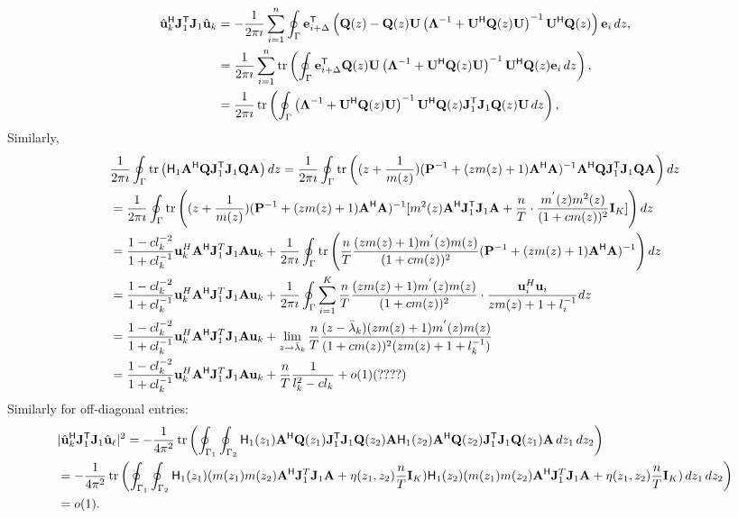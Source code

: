 \documentclass[11pt,a4paper]{article}
\begin{document}
\begin{align*}
		\hat \uu_k^\H \J_1^\T \J_1 \hat \uu_k &= -\frac1{2 \pi \imath} \sum_{i=1}^n \oint_{\Gamma} \ee_{i + \Delta}^\T \left(  \Q(z) - \Q(z) \U \left( \bLambda^{-1} + \U^\H \Q(z) \U \right)^{-1} \U^\H \Q(z) \right) \ee_{i}\,dz, \\ 
		&=\frac1{2 \pi \imath} \sum_{i=1}^n \tr \left(  \oint_{\Gamma} \ee_{i + \Delta}^\T \Q(z) \U \left( \bLambda^{-1} + \U^\H \Q(z) \U \right)^{-1} \U^\H \Q(z) \ee_{i}\,dz \right), \\ 
		&=\frac1{2 \pi \imath} \tr \left( \oint_{\Gamma} \left( \bLambda^{-1} + \U^\H \Q(z) \U \right)^{-1} \U^\H \Q(z) \J_1^\T \J_1 \Q(z) \U\,dz \right),
\end{align*}
Similarly,
\begin{align*}
    &\frac1{2 \pi \imath}  \oint_{\Gamma} \tr \left( \H_1 \A^\H \Q\J_1^\T \J_1 \Q \A \right) dz = \frac1{2 \pi \imath}  \oint_{\Gamma} \tr \left( (z+\frac{1}{m(z)})(\P^{-1} + (zm(z)+1)\A^ \H \A)^{-1} \A^\H \Q\J_1^\T \J_1 \Q \A \right) dz \\
    &= \frac1{2 \pi \imath}  \oint_{\Gamma} \tr \left( (z+\frac{1}{m(z)})(\P^{-1} + (zm(z)+1)\A^ \H \A)^{-1} [m^2(z)\A^\H \J_1^\T \J_1 \A + \frac{n}{T}\cdot\frac{m^{'}(z)m^2(z)}{(1+cm(z))^2}\I_K ]\right) dz \\
    &= \frac{1-c l_k^{-2}}{1+c l_k^{-1}} \uu_k^H \A^\H \J_1^T \J_1 \A \uu_k + \frac1{2 \pi \imath}  \oint_{\Gamma} \tr \left( \frac{n}{T} \frac{(zm(z)+1)m^{'}(z)m(z)}{(1+cm(z))^2} (\P^{-1} + (zm(z)+1)\A^ \H \A)^{-1} \right) dz \\
    &= \frac{1-c l_k^{-2}}{1+c l_k^{-1}} \uu_k^H \A^\H \J_1^T \J_1 \A \uu_k + \frac1{2 \pi \imath}  \oint_{\Gamma} \sum_{i=1}^K  \frac{n}{T} \frac{(zm(z)+1)m^{'}(z)m(z)}{(1+cm(z))^2}\cdot \frac{\uu_i^H \uu_i}{zm(z)+1+l_i^{-1}} dz \\
    &= \frac{1-c l_k^{-2}}{1+c l_k^{-1}} \uu_k^H \A^\H \J_1^T \J_1 \A \uu_k + \lim_{z \to \bar\lambda_k} \frac{n}{T}
     \frac{(z-\bar\lambda_k)(zm(z)+1)m^{'}(z)m(z)}{(1+cm(z))^2(zm(z)+1+l_k^{-1})} \\
     &= \frac{1-c l_k^{-2}}{1+c l_k^{-1}} \uu_k^H \A^\H \J_1^T \J_1 \A \uu_k + \frac{n}{T} \frac{1}{l_k^2-cl_k} +o(1)  (????)
\end{align*}
Similarly for off-diagonal entries:
\begin{align*}
    &|\hat \uu_k^\H \J_1^\T \J_1 \hat \uu_\ell|^2 = - \frac1{4 \pi^2} \tr \left( \oint_{\Gamma_1} \oint_{\Gamma_2} \H_1(z_1)  \A^\H \Q(z_1) \J_1^\T \J_1 \Q(z_2) \A \H_1(z_2)  \A^\H \Q(z_2) \J_1^\T \J_1 \Q(z_1) \A \,dz_1\,dz_2 \right) \\
    &= - \frac1{4 \pi^2} \tr \left( \oint_{\Gamma_1} \oint_{\Gamma_2} \H_1(z_1) (m(z_1)m(z_2)\A^\H \J_1^T \J_1 \A + \eta(z_1,z_2)\frac{n}{T}\I_K)  \H_1(z_2) (m(z_1)m(z_2)\A^\H \J_1^T \J_1 \A + \eta(z_1,z_2)\frac{n}{T}\I_K) \,dz_1\,dz_2 \right) \\
    &= o(1).
\end{align*}
\end{document}
